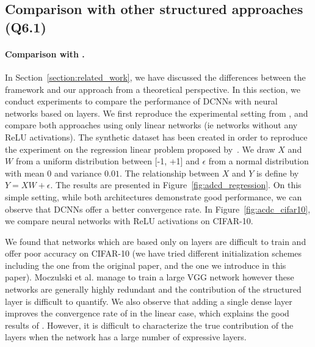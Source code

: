 \subsection{Comparison with other structured approaches (Q6.1)}




\paragraph{Comparison with \ACDC \citep{moczulski2015acdc}.}


In Section~\ref{section:related_work}, we have discussed the differences between the \ACDC framework and our approach from a theoretical perspective.
In this section, we conduct experiments to compare the performance of DCNNs with neural networks based on \ACDC layers. 
We first reproduce the experimental setting from \cite{moczulski2015acdc}, and compare both approaches using only linear networks (ie networks without any ReLU activations).
The synthetic dataset has been created in order to reproduce the experiment on the regression linear problem proposed by~\cite{moczulski2015acdc}.
We draw $X$ and $W$ from a uniform distribution between [-1, +1] and $\epsilon$ from a normal distribution with mean 0 and variance $0.01$.
The relationship between $X$ and $Y$ is define by $Y = XW + \epsilon$. 
The results are presented in Figure~\ref{fig:adcd_regression}.
On this simple setting, while both architectures demonstrate good performance, we can observe that DCNNs offer a better convergence rate.
In Figure~\ref{fig:acdc_cifar10}, we compare neural networks with ReLU activations on CIFAR-10. 

We found that networks which are based only on \ACDC layers are difficult to train and offer poor accuracy on CIFAR-10 (we have tried different initialization schemes including the one from the original paper, and the one we introduce in this paper).
Moczulski et al. \cite{moczulski2015acdc} manage to train a large VGG network  however these networks are generally highly redundant and the contribution of the structured layer is difficult to quantify. 
We also observe that adding a single dense layer improves the convergence rate of  \ACDC in the linear case, which explains the good results of \cite{moczulski2015acdc}.
However, it is difficult to characterize the true contribution of the \ACDC layers when the network has a large number of expressive layers.

